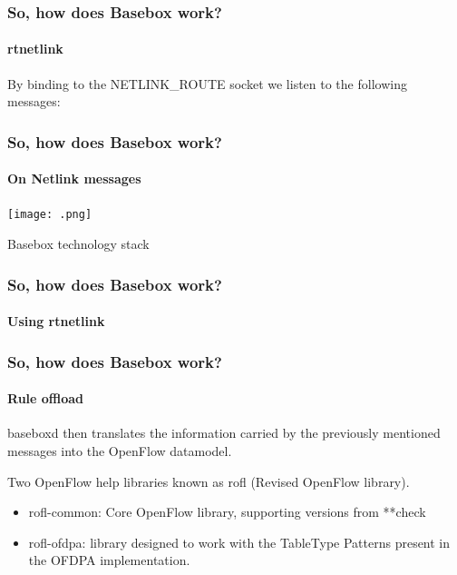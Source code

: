 \documentclass[11pt]{beamer}
\begin{document}
\begin{frame}
\frametitle{So, how does Basebox work?}
\framesubtitle{rtnetlink}

By binding to the NETLINK\_ROUTE socket we listen to the following messages:

{%
\small
{}}

\end{frame}

\begin{frame}
\frametitle{So, how does Basebox work?}
\framesubtitle{On Netlink messages}

\begin{minipage}[t]{0.48\linewidth}
\texttt{[image: .png]}
\caption{Basebox technology stack}

\end{minipage}

\end{frame}

\begin{frame}
\frametitle{So, how does Basebox work?}
\framesubtitle{Using rtnetlink}



\end{frame}

\begin{frame}
\frametitle{So, how does Basebox work?}
\framesubtitle{Rule offload}

baseboxd then translates the information carried by the previously mentioned messages into the OpenFlow datamodel. 

Two OpenFlow help libraries known as rofl (Revised OpenFlow library).
\begin{itemize}
\item rofl-common: Core OpenFlow library, supporting versions from **check
\item rofl-ofdpa: library designed to work with the TableType Patterns present in the OFDPA implementation.
\end{itemize}
\end{frame}
\end{document}
